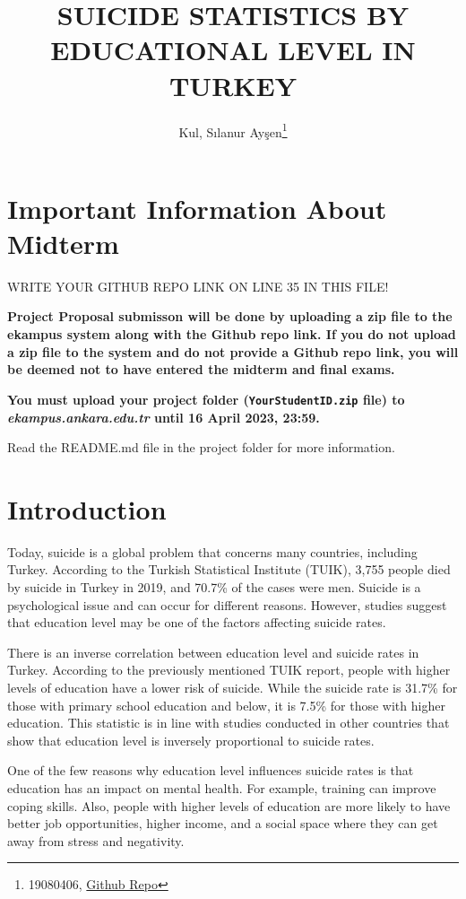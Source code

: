 \documentclass[
  12pt,
]{article}
\title{SUICIDE STATISTICS BY EDUCATIONAL LEVEL IN TURKEY}
\author{Kul, Sılanur Ayşen\footnote{19080406, \href{https://github.com/silakul/midterm}{Github Repo}}}
\date{}
\begin{document}
\maketitle

\hypertarget{important-information-about-midterm}{%
\section{Important Information About Midterm}\label{important-information-about-midterm}}

\colorbox{BurntOrange}{WRITE YOUR GITHUB REPO LINK ON LINE 35 IN THIS FILE!}

\textbf{Project Proposal submisson will be done by uploading a zip file to the ekampus system along with the Github repo link. If you do not upload a zip file to the system and do not provide a Github repo link, you will be deemed not to have entered the midterm and final exams.}

\textbf{You must upload your project folder (\texttt{YourStudentID.zip} file) to \emph{ekampus.ankara.edu.tr} until 16 April 2023, 23:59.}

\colorbox{WildStrawberry}{Read the README.md file in the project folder for more information.}

\hypertarget{introduction}{%
\section{Introduction}\label{introduction}}

Today, suicide is a global problem that concerns many countries, including Turkey. According to the Turkish Statistical Institute (TUIK), 3,755 people died by suicide in Turkey in 2019, and 70.7\% of the cases were men. Suicide is a psychological issue and can occur for different reasons. However, studies suggest that education level may be one of the factors affecting suicide rates.

There is an inverse correlation between education level and suicide rates in Turkey. According to the previously mentioned TUIK report, people with higher levels of education have a lower risk of suicide. While the suicide rate is 31.7\% for those with primary school education and below, it is 7.5\% for those with higher education. This statistic is in line with studies conducted in other countries that show that education level is inversely proportional to suicide rates.

One of the few reasons why education level influences suicide rates is that education has an impact on mental health. For example, training can improve coping skills. Also, people with higher levels of education are more likely to have better job opportunities, higher income, and a social space where they can get away from stress and negativity.
\end{document}
